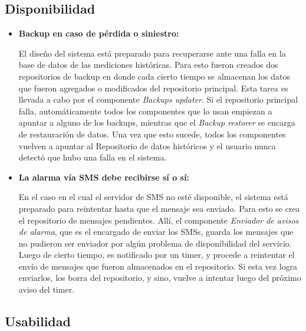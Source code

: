 \subsection{Disponibilidad}

\begin{itemize}
    \item \textbf{Backup en caso de pérdida o siniestro:} 
    \par El diseño del sistema está preparado para recuperarse ante una falla en la base de datos de las mediciones históricas. Para esto fueron creados dos repositorios de backup en donde cada cierto tiempo se almacenan los datos que fueron agregados o modificados del repositorio principal. Esta tarea es llevada a cabo por el componente \textit{Backups updater}. Si el repositorio principal falla, automáticamente todos los componentes que lo usan empiezan a apuntar a alguno de los backups, mientras que el \textit{Backup restorer} se encarga de restauración de datos. Una vez que esto sucede, todos los componentes vuelven a apuntar al Repositorio de datos históricos y el usuario nunca detectó que hubo una falla en el sistema.
    
    \item \textbf{La alarma vía SMS debe recibirse sí o sí:}
    \par En el caso en el cual el servidor de SMS no esté disponible, el sistema está preparado para reintentar hasta que el mensaje sea enviado. Para esto se crea el repositorio de mensajes pendientes. Allí, el componente \textit{Enviador de avisos de alarma}, que es el encargado de enviar los SMSs, guarda los mensajes que no pudieron ser enviador por algún problema de disponibilidad del servicio. Luego de cierto tiempo, es notificado por un timer, y procede a reintentar el envío de mensajes que fueron almacenados en el repositorio. Si esta vez logra enviarlos, los borra del repositorio, y sino, vuelve a intentar luego del próximo aviso del timer. 
\end{itemize}

\subsection{Usabilidad}

